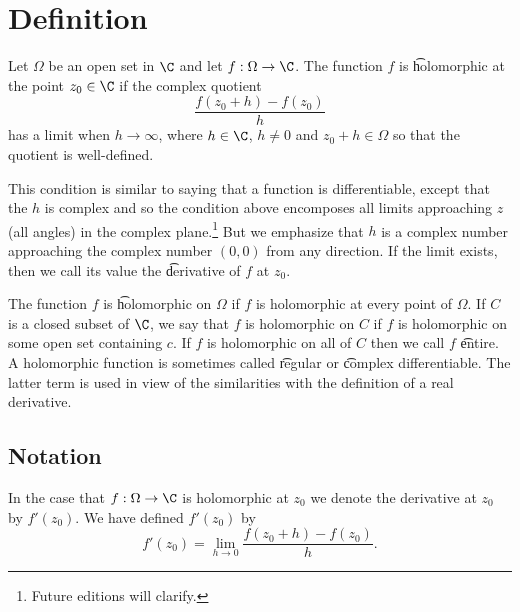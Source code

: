 
\section*{Definition}

Let $\Omega $ be an open set in $\C $ and let $f: \Omega  \to \C $.
The function $f$ is \t{holomorphic at the point} $z_0 \in \C $ if the complex quotient
\[
\frac{f(z_0 + h) - f(z_0)}{h}
\]
has a limit when $h \to \infty$, where $h \in \C $, $h \not= 0$ and $z_0 + h \in \Omega $ so that the quotient is well-defined.

This condition is similar to saying that a function is differentiable, except that the $h$ is complex and so the condition above encomposes all limits approaching $z$ (all angles) in the complex plane.\footnote{Future editions will clarify.}
But we emphasize that $h$ is a complex number approaching the complex number $(0, 0)$ from any direction.
If the limit exists, then we call its value the \t{derivative of $f$ at $z_0$}.

The function $f$ is \t{holomorphic} on $\Omega $ if $f$ is holomorphic at every point of $\Omega $.
If $C$ is a closed subset of $\C $, we say that $f$ is holomorphic on $C$ if $f$ is holomorphic on some open set containing $c$.
If $f$ is holomorphic on all of $C$ then we call $f$ \t{entire}.
A holomorphic function is sometimes called \t{regular} or \t{complex differentiable}.
The latter term is used in view of the similarities with the definition of a real derivative.

\subsection*{Notation}

In the case that $f: \Omega  \to \C $ is holomorphic at $z_0$ we denote the derivative at $z_0$ by $f'(z_0)$.
We have defined $f'(z_0)$ by
\[
f'(z_0) = \lim_{h \to 0} \frac{f(z_0 + h) - f(z_0)}{h}.
\]

\blankpage